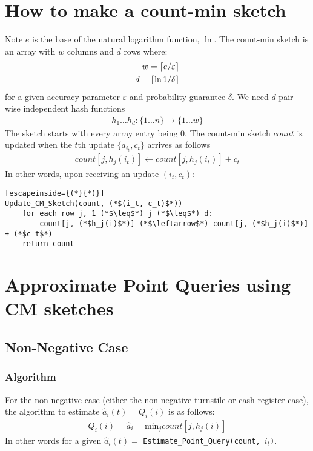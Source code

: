 \documentclass[11pt]{article}
\newcommand{\comment}[1]{}
\newcommand{\sq}{\mathit{Q}_i}
\DeclarePairedDelimiter\ceil{\lceil}{\rceil}
\newcommand{\ra}{\rightarrow}
\begin{document}
\section{How to make a count-min sketch}
Note $e$ is the base of the natural logarithm function, $\ln$. The count-min
sketch is an array with $w$ columns and $d$ rows where:
\begin{align}
    w = \ceil{e/\varepsilon}\\
    d = \ceil{\ln{1/\delta}}
\end{align}
for a given accuracy parameter $\varepsilon$ and probability guarantee $\delta$.
We need $d$ pair-wise independent hash functions
\begin{align}
    h_1 \dots h_d : \{1 \dots n\} \ra \{1 \dots w\} 
\end{align}
The sketch starts with every array entry being 0. The count-min sketch $count$
is updated when the $t$th update $\{a_{i_t}, c_t\}$ arrives as follows
\begin{align}
    count[j, h_j(i_t)] \leftarrow count[j, h_j(i_t)] + c_t     
\end{align}
In other words, upon receiving an update $(i_t, c_t)$:
\begin{lstlisting}[escapeinside={(*}{*)}]
Update_CM_Sketch(count, (*$(i_t, c_t)$*)) 
    for each row j, 1 (*$\leq$*) j (*$\leq$*) d:
        count[j, (*$h_j(i)$*)] (*$\leftarrow$*) count[j, (*$h_j(i)$*)] + (*$c_t$*)
    return count 
\end{lstlisting}

\comment{
\begin{enumerate}
    \item for each row $1 \leq j \leq d$
    \begin{enumerate}
        \item add $c_t$ to the $h_j(i)$th column.
    \end{enumerate}
\end{enumerate}
}
\section{Approximate Point Queries using CM sketches}

\subsection{Non-Negative Case}
\subsubsection{Algorithm}
For the non-negative case (either the non-negative turnstile or cash-register case),
the algorithm to estimate $\hat{a}_i(t) = \sq(i)$ is as follows: 
\begin{align}
    \sq(i) = \hat{a}_i = \text{min}_j count[j, h_j(i)]
\end{align}
In other words for a given $\hat a_i(t) =$ \texttt{Estimate\_Point\_Query(count, $i_t$)}.
\end{document}
